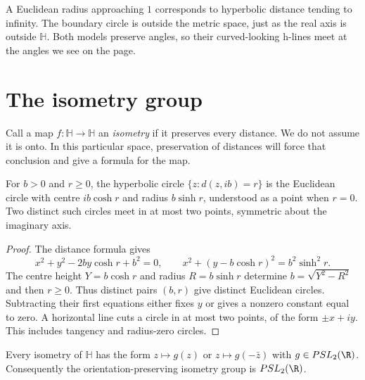 A Euclidean radius approaching $1$ corresponds to hyperbolic distance tending to infinity. The boundary circle is outside the metric space, just as the real axis is outside $\mathbb H$. Both models preserve angles, so their curved-looking h-lines meet at the angles we see on the page.

\section{The isometry group}

Call a map $f:\mathbb H\to\mathbb H$ an \emph{isometry} if it preserves every distance. We do not assume it is onto. In this particular space, preservation of distances will force that conclusion and give a formula for the map.

\begin{lemma}\label{lem:hypcircles}
For $b>0$ and $r\ge0$, the hyperbolic circle $\{z:d(z,ib)=r\}$ is the Euclidean circle with centre $ib\cosh r$ and radius $b\sinh r$, understood as a point when $r=0$. Two distinct such circles meet in at most two points, symmetric about the imaginary axis.
\end{lemma}

\begin{proof}
The distance formula gives
\[
x^2+y^2-2by\cosh r+b^2=0,
\qquad x^2+(y-b\cosh r)^2=b^2\sinh^2r.
\]
The centre height $Y=b\cosh r$ and radius $R=b\sinh r$ determine $b=\sqrt{Y^2-R^2}$ and then $r\ge0$. Thus distinct pairs $(b,r)$ give distinct Euclidean circles. Subtracting their first equations either fixes $y$ or gives a nonzero constant equal to zero. A horizontal line cuts a circle in at most two points, of the form $\pm x+iy$. This includes tangency and radius-zero circles.
\end{proof}

\begin{theorem}\label{thm:isometries}
Every isometry of $\mathbb H$ has the form $z\mapsto g(z)$ or $z\mapsto g(-\bar z)$ with $g\in PSL_2(\R)$. Consequently the orientation-preserving isometry group is $PSL_2(\R)$.
\end{theorem}

